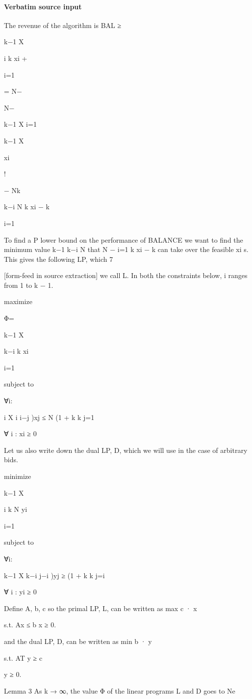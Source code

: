 \documentclass[10pt]{article}
\begin{document}
\paragraph{Verbatim source input}
\begin{ReviewVerbatim}
The revenue of the algorithm is
BAL ≥

k−1
X

i
k xi +

i=1

= N−

N−

k−1
X
i=1

k−1
X

xi

!

− Nk

k−i
N
k xi − k

i=1

To find a P
lower bound on the performance of BALANCE we want to find the minimum value
k−1 k−i
N
that N − i=1
k xi − k can take over the feasible {xi }s. This gives the following LP, which
7


[form-feed in source extraction]
we call L. In both the constraints below, i ranges from 1 to k − 1.

maximize

Φ=

k−1
X

k−i
k xi

i=1

subject to

∀i:

i
X
i
i−j
)xj ≤ N
(1 +
k
k
j=1

∀ i : xi ≥ 0

Let us also write down the dual LP, D, which we will use in the case of arbitrary bids.

minimize

k−1
X

i
k N yi

i=1

subject to

∀i:

k−1
X
k−i
j−i
)yj ≥
(1 +
k
k
j=i

∀ i : yi ≥ 0

Define A, b, c so the primal LP, L, can be written as
max c · x

s.t. Ax ≤ b x ≥ 0.

and the dual LP, D, can be written as
min b · y

s.t. AT y ≥ c

y ≥ 0.

Lemma 3 As k → ∞, the value Φ of the linear programs L and D goes to Ne
\end{ReviewVerbatim}
\end{document}

